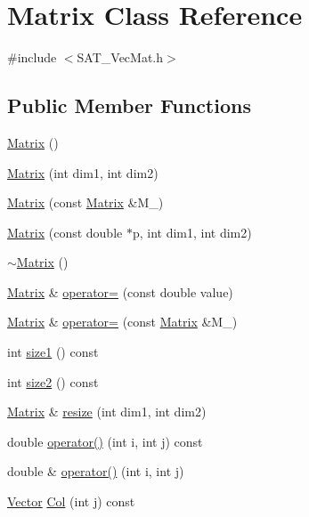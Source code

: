 \hypertarget{classMatrix}{\section{Matrix Class Reference}
\label{classMatrix}
}


{\ttfamily \#include $<$S\-A\-T\-\_\-\-Vec\-Mat.\-h$>$}

\subsection*{Public Member Functions}
\begin{DoxyCompactItemize}
\item 
\hyperlink{classMatrix_a2dba13c45127354c9f75ef576f49269b}{Matrix} ()
\item 
\hyperlink{classMatrix_ac6dcd2d09c273e9d4aa825c688e27fd7}{Matrix} (int dim1, int dim2)
\item 
\hyperlink{classMatrix_ad8e1e1f4689815ba1064aa83c8dec516}{Matrix} (const \hyperlink{classMatrix}{Matrix} \&M\-\_\-)
\item 
\hyperlink{classMatrix_aaa7470f25c28612e0166e201a8bdb77e}{Matrix} (const double $\ast$p, int dim1, int dim2)
\item 
\hyperlink{classMatrix_a9b1c3627f573d78a2f08623fdfef990f}{$\sim$\-Matrix} ()
\item 
\hyperlink{classMatrix}{Matrix} \& \hyperlink{classMatrix_aeb7802816a5f9c01e0703f1a6a691e9b}{operator=} (const double value)
\item 
\hyperlink{classMatrix}{Matrix} \& \hyperlink{classMatrix_ac2667ec6586a945d5062d95e762ad1d4}{operator=} (const \hyperlink{classMatrix}{Matrix} \&M\-\_\-)
\item 
int \hyperlink{classMatrix_aec0c767dcd6da0724ccb6df4ec0f2a82}{size1} () const 
\item 
int \hyperlink{classMatrix_a306220f01f6859a16e738590214d008d}{size2} () const 
\item 
\hyperlink{classMatrix}{Matrix} \& \hyperlink{classMatrix_aed4e281aadfd6055e02e950988d6d427}{resize} (int dim1, int dim2)
\item 
double \hyperlink{classMatrix_ac6b0e8ce2c566a0379bd8da579d1cb45}{operator()} (int i, int j) const 
\item 
double \& \hyperlink{classMatrix_ad6c820c473b60706e10a7b43fa6575ee}{operator()} (int i, int j)
\item 
\hyperlink{classVector}{Vector} \hyperlink{classMatrix_a02c825325655a07eb94e4a57478a4c18}{Col} (int j) const 

\end{DoxyCompactItemize}

